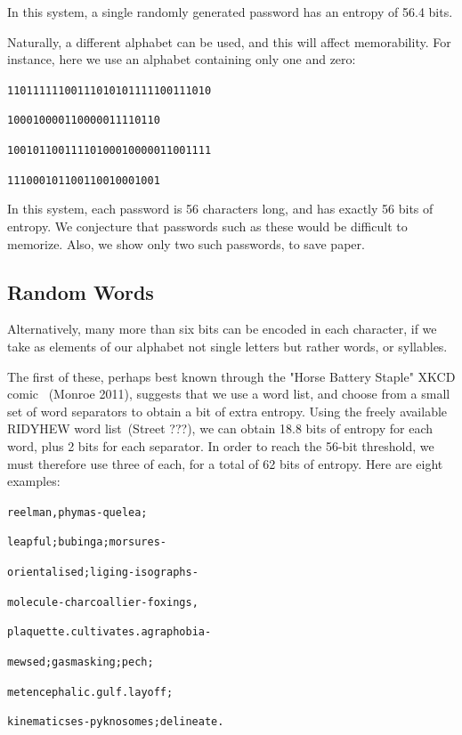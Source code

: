\documentclass[preprint]{soups}
\newcommand{\Scribtexttt}[1]{{\texttt{#1}}}
\newenvironment{SingleColumn}{\begin{list}{}{\topsep=0pt\partopsep=0pt%
\listparindent=0pt\itemindent=0pt\labelwidth=0pt\leftmargin=0pt\rightmargin=0pt%
\itemsep=0pt\parsep=0pt}\item}{\end{list}}
\let\SOriginalthesubsubsection\thesubsubsection
\newcommand{\Ssubsection}[2]{\subsection[#1]{#2}\let\thesubsubsection\SOriginalthesubsubsection}
\begin{document}
In this system, a single randomly generated password has an
entropy of 56.4 bits.

Naturally, a different alphabet can be used, and this will
affect memorability. For instance, here we use an alphabet
containing only one and zero:

\begin{SingleColumn}\Scribtexttt{11011111100111010101111100111010}

\Scribtexttt{}\mbox{\hphantom{\Scribtexttt{x}}}\Scribtexttt{100010000110000011110110}

\Scribtexttt{10010110011110100010000011001111}

\Scribtexttt{}\mbox{\hphantom{\Scribtexttt{x}}}\Scribtexttt{111000101100110010001001}\end{SingleColumn}

In this system, each password is 56 characters long, and has
exactly 56 bits of entropy. We conjecture that passwords
such as these would be difficult to memorize. Also, we show
only two such passwords, to save paper.

\Ssubsection{Random Words}{Random Words}\label{t:x28part_x22Randomx5fWordsx22x29}

Alternatively, many more than six bits can be encoded in
each character, if we take as elements of our alphabet not
single letters but rather words, or syllables.

The first of these, perhaps best known through the "Horse
Battery Staple" XKCD comic ~(Monroe 2011),
suggests that we use a word list, and choose from a small
set of word separators to obtain a bit of extra entropy.
Using the freely available RIDYHEW word list~(Street ???),
we can obtain 18.8 bits of entropy for each word, plus 2
bits for each separator. In order to reach the 56{-}bit
threshold, we must therefore use three of each, for a total
of 62 bits of entropy. Here are eight examples:

\begin{SingleColumn}\Scribtexttt{reelman,phymas{-}quelea;}

\Scribtexttt{leapful;bubinga;morsures{-}}

\Scribtexttt{orientalised;liging{-}isographs{-}}

\Scribtexttt{molecule{-}charcoallier{-}foxings,}

\Scribtexttt{plaquette{\hbox{\texttt{.}}}cultivates{\hbox{\texttt{.}}}agraphobia{-}}

\Scribtexttt{mewsed;gasmasking;pech;}

\Scribtexttt{metencephalic{\hbox{\texttt{.}}}gulf{\hbox{\texttt{.}}}layoff;}

\Scribtexttt{kinematicses{-}pyknosomes;delineate{\hbox{\texttt{.}}}}\end{SingleColumn}
\end{document}
